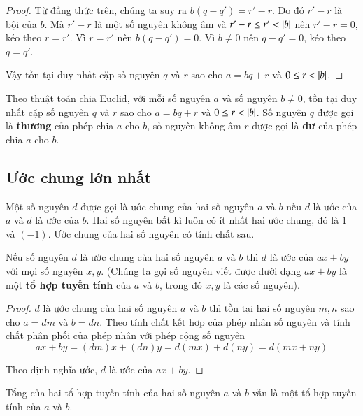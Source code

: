 \begin{proof}
	Từ đẳng thức trên, chúng ta suy ra $b(q - q') = r' - r$. Do đó $r' - r$ là bội của $b$. Mà $r' - r$ là một số nguyên không âm và $r' - r\leq r' < \left\vert{b}\right\vert$ nên $r' - r = 0$, kéo theo $r = r'$. Vì $r = r'$ nên $b(q - q') = 0$. Vì $b\ne 0$ nên $q - q' = 0$, kéo theo $q = q'$.

	Vậy tồn tại duy nhất cặp số nguyên $q$ và $r$ sao cho $a = bq + r$ và $0\leq r < \left\vert{b}\right\vert$.
\end{proof}

\begin{definition}[Thương và Dư]
	Theo thuật toán chia Euclid, với mỗi số nguyên $a$ và số nguyên $b\ne 0$, tồn tại duy nhất cặp số nguyên $q$ và $r$ sao cho $a = bq + r$ và $0\leq r < \left\vert{b}\right\vert$. Số nguyên $q$ được gọi là \textbf{thương} của phép chia $a$ cho $b$, số nguyên không âm $r$ được gọi là \textbf{dư} của phép chia $a$ cho $b$.
\end{definition}

\subsection{Ước chung lớn nhất}

Một số nguyên $d$ được gọi là ước chung của hai số nguyên $a$ và $b$ nếu $d$ là ước của $a$ và $d$ là ước của $b$. Hai số nguyên bất kì luôn có ít nhất hai ước chung, đó là $1$ và $(-1)$. Ước chung của hai số nguyên có tính chất sau.

\begin{theorem}\label{theorem:linear-combination-and-common-divisor}
	Nếu số nguyên $d$ là ước chung của hai số nguyên $a$ và $b$ thì $d$ là ước của $ax + by$ với mọi số nguyên $x, y$. (Chúng ta gọi số nguyên viết được dưới dạng $ax + by$ là một \textbf{tổ hợp tuyến tính} của $a$ và $b$, trong đó $x, y$ là các số nguyên).
\end{theorem}

\begin{proof}
	$d$ là ước chung của hai số nguyên $a$ và $b$ thì tồn tại hai số nguyên $m, n$ sao cho $a = dm$ và $b = dn$. Theo tính chất kết hợp của phép nhân số nguyên và tính chất phân phối của phép nhân với phép cộng số nguyên
	\[
		ax + by = (dm)x + (dn)y = d(mx) + d(ny) = d(mx + ny)
	\]

	Theo định nghĩa ước, $d$ là ước của $ax + by$.
\end{proof}

\begin{theorem}
	Tổng của hai tổ hợp tuyến tính của hai số nguyên $a$ và $b$ vẫn là một tổ hợp tuyến tính của $a$ và $b$.
\end{theorem}

